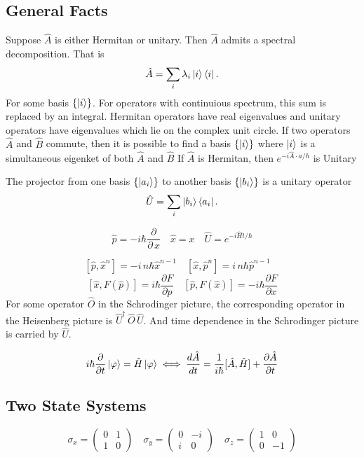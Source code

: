 \documentclass{article}
\begin{document}
  \twocolumn
    \subsection*{General Facts}
      Suppose $\hat{A}$ is either Hermitan or unitary. Then  $\hat{A}$ admits a 
      spectral decomposition. That is 
      \[
         \hat{A} = \sum_i \lambda_i \ket{i}\bra{i}
      .\] 
      For some basis $\{\ket{i} \}$. For operators with continuious spectrum,
      this sum is replaced by an integral. 
      Hermitan operators have real eigenvalues and unitary operators 
      have eigenvalues which lie on the complex unit circle.
      If two operators $\hat{A}$ and  $\hat{B}$ commute, then it is possible 
      to find a basis  $\{\ket{i}\}$ where $ \ket{i}$ is a simultaneous eigenket
      of both $\hat{A}$ and  $\hat{B}$
      If $\hat{A}$ is Hermitan, then  $e^{-i \hat{A} \cdot a / \hbar}$
      is Unitary

      The projector from one basis $ \{\ket{a_i}\}$ to another basis 
      $\{\ket{b_i}\}$ is a unitary operator \[
        \hat{U} = \sum_i \ket{b_i}\bra{a_i}
      .\] 
        
    \[
      \hat{p} = - i \hbar \frac{\partial}{\partial\,x} \quad
      \hat{x} = x \quad
      \hat{U} = e^{-i \hat{H} t / \hbar}
    \]
    
    \[
      [\hat{p},\hat{x}^n] = -i \,n \hbar \hat{x}^{n-1} \quad
      [\hat{x},\hat{p}^n] = i\,n  \hbar \hat{p}^{n-1} \quad
    \]
    \[
      [\hat{x},F(\hat{p})] = i \hbar \frac{\partial F}{\partial p} \quad
      [\hat{p},F(\hat{x})] =-i \hbar \frac{\partial F}{\partial x}
    \] 
    For some operator \(\hat{O}\) in the Schrodinger picture,
    the corresponding operator in the Heisenberg picture is 
    \(\hat{U}^\dagger\, \hat{O} \, \hat{U}\). And time dependence 
    in the Schrodinger picture is carried by \(\hat{U}\).
    

    \[
      i \hbar \frac{\partial}{\partial t} \ket{\varphi} = \hat{H} \ket{\varphi} 
      \iff \frac{d \hat{A}}{dt} = \frac{1}{i \hbar}[\hat{A},\hat{H}] + 
      \frac{\partial \hat{A}}{\partial t} 
    \]

    \subsection*{Two State Systems}
      \[
      \sigma_x = \begin{pmatrix} 0 & 1 \\ 1 & 0 \end{pmatrix} \quad
      \sigma_y = \begin{pmatrix} 0 & -i \\ i & 0 \end{pmatrix} \quad
      \sigma_z = \begin{pmatrix} 1 & 0 \\ 0 & -1 \end{pmatrix}
    \]
\end{document}
